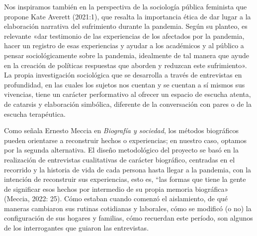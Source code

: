 Nos inspiramos también en la perspectiva de la sociología pública feminista que propone Kate Averett (2021:1), que resalta la importancia ética de dar lugar a la elaboración narrativa del sufrimiento durante la pandemia. Según su planteo, es relevante «dar testimonio de las experiencias de los afectados por la pandemia, hacer un registro de esas experiencias y ayudar a los académicos y al público a pensar sociológicamente sobre la pandemia, idealmente de tal manera que ayude en la creación de políticas respuestas que aborden y reduzcan este sufrimiento». La propia investigación sociológica que se desarrolla a través de entrevistas en profundidad, en las cuales los sujetos nos cuentan y se cuentan a sí mismos sus vivencias, tiene un carácter performativo al ofrecer un espacio de escucha atenta, de catarsis y elaboración simbólica, diferente de la conversación con pares o de la escucha terapéutica.

Como señala Ernesto Meccia en \emph{Biografía y sociedad}, los métodos biográficos pueden orientarse a reconstruir hechos o experiencias; en nuestro caso, optamos por la segunda alternativa. El diseño metodológico del proyecto se basó en la realización de entrevistas cualitativas de carácter biográfico, centradas en el recorrido y la historia de vida de cada persona hasta llegar a la pandemia, con la intención de reconstruir sus experiencias, esto es, ``las formas que tiene la gente de significar esos hechos por intermedio de su propia memoria biográfica» (Meccia, 2022: 25). Cómo estaban cuando comenzó el aislamiento, de qué maneras cambiaron sus rutinas cotidianas y laborales, cómo se modificó (o no) la configuración de sus hogares y familias, cómo recuerdan este período, son algunos de los interrogantes que guiaron las entrevistas.

